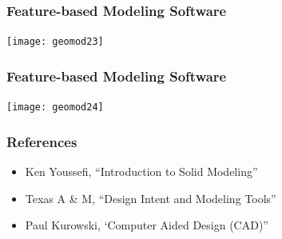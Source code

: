 \begin{frame}[fragile]\frametitle{Feature-based Modeling Software}

			\begin{center}
	\texttt{[image: geomod23]}
			\end{center}
\end{frame}

\begin{frame}[fragile]\frametitle{Feature-based Modeling Software}

			\begin{center}
	\texttt{[image: geomod24]}
			\end{center}
\end{frame}

\begin{frame}[fragile]\frametitle{References}

\begin{itemize}
\item Ken Youssefi, “Introduction to Solid Modeling”
\item Texas A \& M, “Design Intent and Modeling Tools”
\item Paul Kurowski, ‘Computer Aided Design (CAD)”
\end{itemize}
\end{frame}